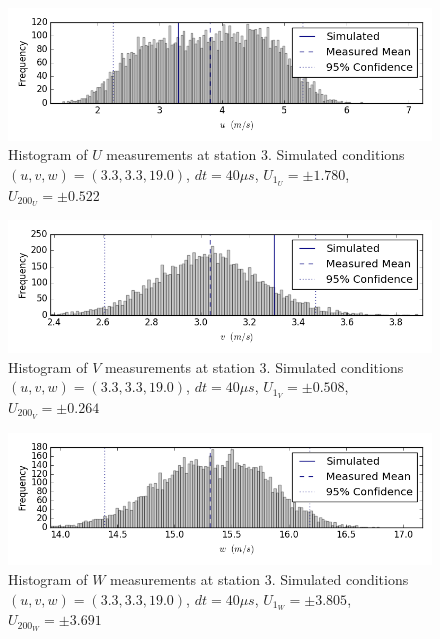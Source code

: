 \begin{figure}[H]
\centering
\includegraphics[width=6in]{figs/Ely_May28th03002/uncertainty_Ely_May28th03002_U}
\caption{Histogram of $U$ measurements at station 3. Simulated conditions $(u,v,w)=(3.3, 3.3, 19.0)$, $dt=40 \mu s$, $U_1_U=\pm 1.780$, $U_200_U=\pm 0.522$}
\label{fig:uncertainty_Ely_May28th03002_U}
\end{figure}


\begin{figure}[H]
\centering
\includegraphics[width=6in]{figs/Ely_May28th03002/uncertainty_Ely_May28th03002_V}
\caption{Histogram of $V$ measurements at station 3. Simulated conditions $(u,v,w)=(3.3, 3.3, 19.0)$, $dt=40 \mu s$, $U_1_V=\pm 0.508$, $U_200_V=\pm 0.264$}
\label{fig:uncertainty_Ely_May28th03002_V}
\end{figure}


\begin{figure}[H]
\centering
\includegraphics[width=6in]{figs/Ely_May28th03002/uncertainty_Ely_May28th03002_W}
\caption{Histogram of $W$ measurements at station 3. Simulated conditions $(u,v,w)=(3.3, 3.3, 19.0)$, $dt=40 \mu s$, $U_1_W=\pm 3.805$, $U_200_W=\pm 3.691$}
\label{fig:uncertainty_Ely_May28th03002_W}
\end{figure}


